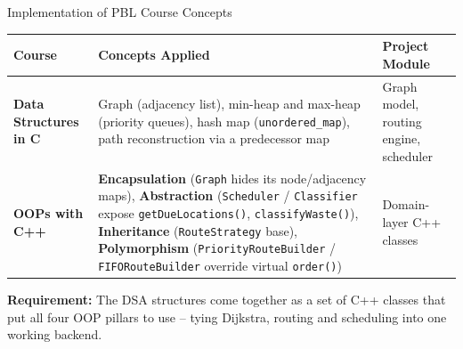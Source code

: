 \documentclass[aspectratio=169,11pt]{beamer}
\begin{document}
\begin{frame}{Implementation of PBL Course Concepts}
\scriptsize
\begin{center}
\renewcommand{\arraystretch}{1.3}
\begin{tabularx}{.98\textwidth}{@{}>{\bfseries}p{2.6cm}>{\raggedright\arraybackslash}X>{\raggedright\arraybackslash}p{2.7cm}@{}}
\toprule
Course & Concepts Applied & Project Module\\
\midrule
Data Structures in C & Graph (adjacency list), min-heap and max-heap (priority queues), hash map (\texttt{unordered\_map}), path reconstruction via a predecessor map & Graph model, routing engine, scheduler\\
OOPs with C++ & \textbf{Encapsulation} (\texttt{Graph} hides its node/adjacency maps), \textbf{Abstraction} (\texttt{Scheduler} / \texttt{Classifier} expose \texttt{getDueLocations()}, \texttt{classifyWaste()}), \textbf{Inheritance} (\texttt{RouteStrategy} base), \textbf{Polymorphism} (\texttt{PriorityRouteBuilder} / \texttt{FIFORouteBuilder} override virtual \texttt{order()}) & Domain-layer C++ classes\\
\bottomrule
\end{tabularx}
\end{center}
\vfill
\begin{center}
\colorbox{GEULightBlue}{\parbox{.9\textwidth}{\centering
\textbf{Requirement:} The DSA structures come together as a set of C++ classes that put all four OOP pillars to use -- tying Dijkstra, routing and scheduling into one working backend.}}
\end{center}
\end{frame}
\end{document}
